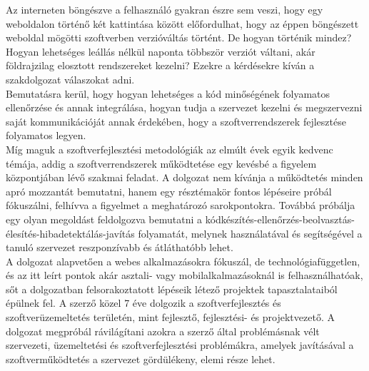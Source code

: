 Az interneten böngészve a felhasználó gyakran észre sem veszi, hogy egy weboldalon történő két kattintása között előfordulhat, hogy az éppen böngészett weboldal mögötti szoftverben verzióváltás történt. De hogyan történik mindez? Hogyan lehetséges leállás nélkül naponta többször verziót váltani, akár földrajzilag elosztott rendszereket kezelni? Ezekre a kérdésekre kíván a szakdolgozat válaszokat adni.
\\
Bemutatásra kerül, hogy hogyan lehetséges a kód minőségének folyamatos ellenőrzése és annak integrálása, hogyan tudja a szervezet kezelni és megszervezni saját kommunikációját annak érdekében, hogy a szoftverrendszerek fejlesztése folyamatos legyen.
\\
Míg maguk a szoftverfejlesztési metodológiák az elmúlt évek egyik kedvenc témája, addig a szoftverrendszerek működtetése egy kevésbé a figyelem központjában lévő szakmai feladat. A dolgozat nem kívánja a működtetés minden apró mozzantát bemutatni, hanem egy résztémakör fontos lépéseire próbál fókuszálni, felhívva a figyelmet a meghatározó sarokpontokra. Továbbá próbálja egy olyan megoldást feldolgozva bemutatni a kódkészítés-ellenőrzés-beolvasztás-élesítés-hibadetektálás-javítás folyamatát, melynek használatával és segítségével a tanuló szervezet reszponzívabb és átláthatóbb lehet.
\\
A dolgozat alapvetően a webes alkalmazásokra fókuszál, de technológiafüggetlen, és az itt leírt pontok akár asztali- vagy mobilalkalmazásoknál is felhasználhatóak, sőt a dolgozatban felsorakoztatott lépéseik létező projektek tapasztalataiból épülnek fel. A szerző közel 7 éve dolgozik a szoftverfejlesztés és szoftverüzemeltetés területén, mint fejlesztő, fejlesztési- és projektvezető. A dolgozat megpróbál rávilágítani azokra a szerző által problémásnak vélt szervezeti, üzemeltetési és szoftverfejlesztési problémákra, amelyek javításával a szoftverműködtetés a szervezet gördülékeny, elemi része lehet.